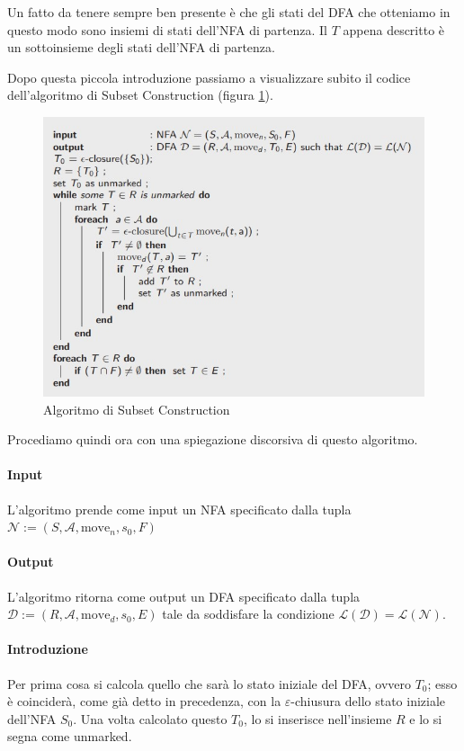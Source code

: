 \documentclass[class=book, crop=false, oneside, 12pt]{standalone}
\begin{document}
Un fatto da tenere sempre ben presente è che gli stati del DFA che otteniamo in questo modo sono insiemi di stati dell'NFA di partenza. Il \(T\) appena descritto è un sottoinsieme degli stati dell'NFA di partenza.

Dopo questa piccola introduzione passiamo a visualizzare subito il codice dell'algoritmo di Subset Construction (figura \ref{algoritmo_subset_construction}).
\begin{figure}
    \centering
    \includegraphics[width=.8\textwidth,keepaspectratio]{subset_construction_algorithm.jpg}
    \caption{Algoritmo di Subset Construction}
    \label{algoritmo_subset_construction}
\end{figure}
Procediamo quindi ora con una spiegazione discorsiva di questo algoritmo.
\paragraph*{Input}
L'algoritmo prende come input un NFA specificato dalla tupla \(\mathcal{N} := (S, \mathcal{A}, \textrm{move}_n, s_0, F)\)

\paragraph*{Output}
L'algoritmo ritorna come output un DFA specificato dalla tupla \(\mathcal{D} := (R, \mathcal{A}, \textrm{move}_d, s_0, E)\) tale da soddisfare la condizione \(\mathcal{L}(\mathcal{D}) = \mathcal{L}(\mathcal{N})\).

\paragraph*{Introduzione}
Per prima cosa si calcola quello che sarà lo stato iniziale del DFA, ovvero \(T_0\); esso è coinciderà, come già detto in precedenza, con la \(\varepsilon\)-chiusura dello stato iniziale dell'NFA \(S_0\). Una volta calcolato questo \(T_0\),  lo si inserisce nell'insieme \(R\) e lo si segna come unmarked.
\end{document}
